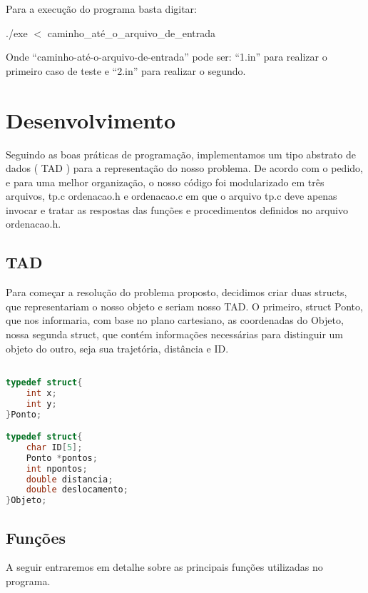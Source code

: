 \documentclass{article}
\begin{document}
Para a execução do programa basta digitar:
\begin{tcolorbox}[title=,width=\linewidth]
    ./exe $<$ caminho\_até\_o\_arquivo\_de\_entrada
\end{tcolorbox}

Onde “caminho-até-o-arquivo-de-entrada” pode ser: “1.in” para realizar o primeiro caso de teste e “2.in” para realizar o segundo.

\clearpage



\section{Desenvolvimento}

Seguindo as boas práticas de programação, implementamos um tipo abstrato de dados 
( TAD ) para a representação do nosso problema. De acordo com o pedido, e para uma 
melhor organização, o nosso código foi modularizado em três arquivos, tp.c ordenacao.h e
ordenacao.c em que o arquivo tp.c deve apenas invocar e tratar as respostas das funções e 
procedimentos definidos no arquivo ordenacao.h.

\subsection{TAD}
Para começar a resolução do problema proposto, decidimos criar duas structs, 
que representariam o nosso objeto e seriam nosso TAD. O primeiro, struct Ponto, 
que nos informaria, com base no plano cartesiano, as coordenadas do Objeto,
nossa segunda struct, que contém informações necessárias para distinguir um 
objeto do outro, seja sua trajetória, distância e ID.

\begin{lstlisting}[caption={TAD's representando Ponto e Objeto, respectivamente},label={lst:cod1},language=C]

typedef struct{
    int x;
    int y;
}Ponto;

typedef struct{
    char ID[5];
    Ponto *pontos;
    int npontos;
    double distancia;
    double deslocamento;
}Objeto;

\end{lstlisting}

\subsection{Funções}

A seguir entraremos em detalhe sobre as principais funções utilizadas no programa.
\end{document}
